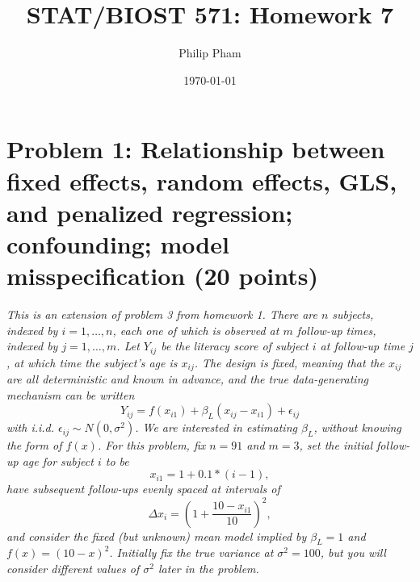 \documentclass[11pt, letterpaper]{article}
\title{STAT/BIOST 571: Homework 7}
\author{Philip Pham}
\date{\today}
\begin{document}
\maketitle

\section*{Problem 1: Relationship between fixed effects, random effects, GLS, and penalized regression; confounding; model misspecification (20 points)} 

{\em This is an extension of problem  3 from homework 1.  There are $n$ subjects, indexed by $i=1,\ldots,n$, each one of which is observed at
$m$ follow-up times, indexed by $j=1,\ldots,m$.  Let $Y_{ij}$ be the literacy score of subject $i$ at follow-up time $j$, at which time the subject's age is $x_{ij}$.  
The design is fixed, meaning that the $x_{ij}$ are all
deterministic and known in advance, and the true data-generating
mechanism can be written
\[
Y_{ij}=f(x_{i1})+\beta_L(x_{ij}-x_{i1})+\epsilon_{ij}
\]
with i.i.d. $\epsilon_{ij}\sim N(0,\sigma^2)$.  We are interested in estimating $\beta_L$,
without knowing the form of $f(x)$.
For this problem, fix $n=91$ and $m=3$, set 
the initial follow-up age for subject $i$ to be 
\[
x_{i1}=1+0.1*(i-1),
\]
have subsequent follow-ups evenly spaced at intervals of 
\[
\Delta x_i = (1 + \frac{10-x_{i1}}{10})^2,
\]
and consider the fixed (but unknown) mean model implied by $\beta_L=1$ and  $f(x) = (10-x)^2$.
Initially fix the true variance at $\sigma^2 = 100$, but you will consider different values of $\sigma^2$ later in the problem. }
\end{document}
